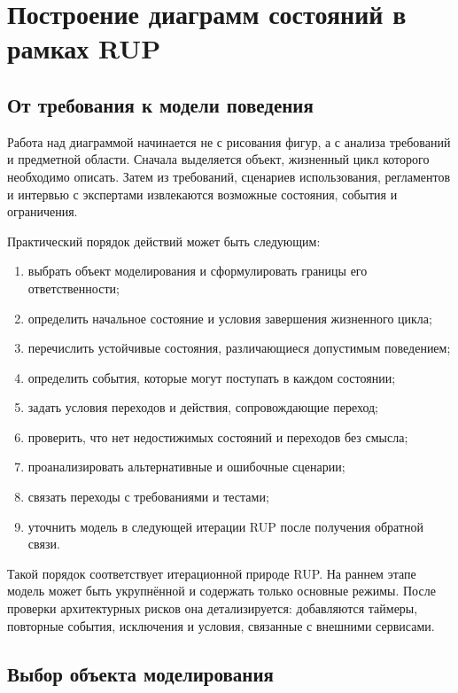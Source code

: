 \documentclass[essay,paper]{pmk-graduate}
\begin{document}
\section{Построение диаграмм состояний в рамках RUP}

\subsection{От требования к модели поведения}

Работа над диаграммой начинается не с рисования фигур, а с анализа требований и предметной области. Сначала выделяется объект, жизненный цикл которого необходимо описать. Затем из требований, сценариев использования, регламентов и интервью с экспертами извлекаются возможные состояния, события и ограничения.

Практический порядок действий может быть следующим:
\begin{enumerate}
  \item выбрать объект моделирования и сформулировать границы его ответственности;
  \item определить начальное состояние и условия завершения жизненного цикла;
  \item перечислить устойчивые состояния, различающиеся допустимым поведением;
  \item определить события, которые могут поступать в каждом состоянии;
  \item задать условия переходов и действия, сопровождающие переход;
  \item проверить, что нет недостижимых состояний и переходов без смысла;
  \item проанализировать альтернативные и ошибочные сценарии;
  \item связать переходы с требованиями и тестами;
  \item уточнить модель в следующей итерации RUP после получения обратной связи.
\end{enumerate}

Такой порядок соответствует итерационной природе RUP. На раннем этапе модель может быть укрупнённой и содержать только основные режимы. После проверки архитектурных рисков она детализируется: добавляются таймеры, повторные события, исключения и условия, связанные с внешними сервисами.

\subsection{Выбор объекта моделирования}
\end{document}
